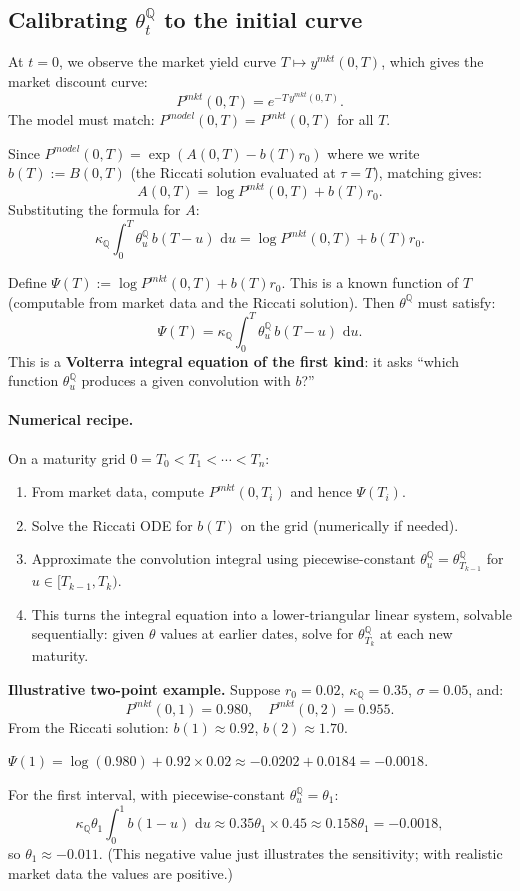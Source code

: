 \documentclass[11pt]{article}
\newcommand{\QQ}{\mathbb{Q}}
\newcommand{\dd}{\,\mathrm{d}}
\begin{document}
\subsection{Calibrating $\theta_t^\QQ$ to the initial curve}

At $t=0$, we observe the market yield curve $T\mapsto y^{mkt}(0,T)$, which
gives the market discount curve:
\[
P^{mkt}(0,T) = e^{-T\,y^{mkt}(0,T)}.
\]
The model must match: $P^{model}(0,T) = P^{mkt}(0,T)$ for all $T$.

Since $P^{model}(0,T) = \exp(A(0,T) - b(T)r_0)$ where we write
$b(T) := B(0,T)$ (the Riccati solution evaluated at $\tau=T$), matching
gives:
\[
A(0,T) = \log P^{mkt}(0,T) + b(T)r_0.
\]
Substituting the formula for $A$:
\[
\kappa_\QQ\int_0^T \theta_u^\QQ\,b(T-u)\,\dd u
= \log P^{mkt}(0,T) + b(T)r_0.
\]

Define $\Psi(T) := \log P^{mkt}(0,T) + b(T)r_0$.  This is a known
function of $T$ (computable from market data and the Riccati solution).
Then $\theta^\QQ$ must satisfy:
\[
\boxed{
\Psi(T) = \kappa_\QQ\int_0^T \theta_u^\QQ\,b(T-u)\,\dd u.
}
\]
This is a \textbf{Volterra integral equation of the first kind}: it asks
``which function $\theta_u^\QQ$ produces a given convolution with $b$?''

\paragraph{Numerical recipe.}  On a maturity grid $0 = T_0 < T_1 < \cdots < T_n$:
\begin{enumerate}
  \item From market data, compute $P^{mkt}(0,T_i)$ and hence $\Psi(T_i)$.
  \item Solve the Riccati ODE for $b(T)$ on the grid (numerically if needed).
  \item Approximate the convolution integral using piecewise-constant
  $\theta_u^\QQ = \theta_{T_{k-1}}^\QQ$ for $u\in[T_{k-1},T_k)$.
  \item This turns the integral equation into a lower-triangular linear
  system, solvable sequentially: given $\theta$ values at earlier dates,
  solve for $\theta_{T_k}^\QQ$ at each new maturity.
\end{enumerate}

\begin{example_box}
\textbf{Illustrative two-point example.}  Suppose $r_0=0.02$, $\kappa_\QQ=0.35$, $\sigma=0.05$, and:
\[
P^{mkt}(0,1) = 0.980, \quad P^{mkt}(0,2) = 0.955.
\]
From the Riccati solution: $b(1)\approx 0.92$, $b(2)\approx 1.70$.

$\Psi(1) = \log(0.980) + 0.92\times0.02 \approx -0.0202 + 0.0184 = -0.0018$.

For the first interval, with piecewise-constant $\theta_u^\QQ = \theta_1$:
\[
\kappa_\QQ\theta_1\int_0^1 b(1-u)\,\dd u \approx 0.35\theta_1\times 0.45 \approx 0.158\theta_1 = -0.0018,
\]
so $\theta_1 \approx -0.011$.  (This negative value just illustrates the
sensitivity; with realistic market data the values are positive.)
\end{example_box}
\end{document}
